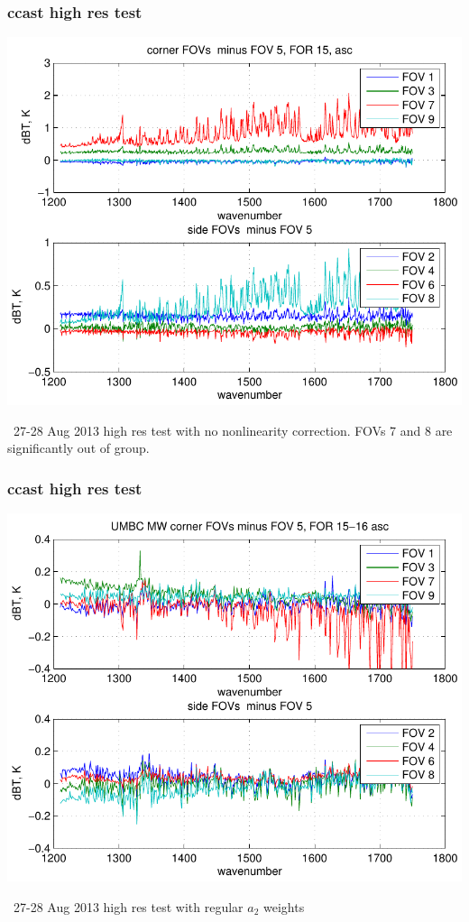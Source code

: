 \documentclass[11pt]{beamer}
\begin{document}
\begin{frame}
\frametitle{ccast high res test}

\begin{center}
  \includegraphics[scale=0.6]{hires_no_corr.pdf}
\end{center}

\ccast\ 27-28 Aug 2013 high res test with no nonlinearity
correction.  FOVs 7 and 8 are significantly out of group.

\end{frame}
\begin{frame}
\frametitle{ccast high res test}

\begin{center}
  \includegraphics[scale=0.6]{hires_ref_corr.pdf}
\end{center}

\ccast\ 27-28 Aug 2013 high res test with regular $a_2$ weights

\end{frame}
\end{document}
